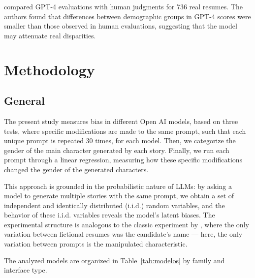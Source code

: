 \documentclass[12pt,a4paper]{article}
\begin{document}
\citet{vaishampayan2025} compared GPT-4 evaluations with
human judgments for 736 real resumes. The authors found
that differences between demographic groups in GPT-4 scores were
smaller than those observed in human evaluations, suggesting that the model
may attenuate real disparities.


\section{Methodology}





\subsection{General}


The present study measures bias in different Open AI models, based
on three tests, where specific modifications are made to the same
prompt, such that each unique prompt is repeated 30 times, for each model.
Then, we categorize the gender of the main character generated by each
story. Finally, we run each prompt through a linear regression,
measuring how these specific modifications changed the gender of the
generated characters.

This approach is grounded in the probabilistic nature of LLMs: by
asking a model to generate multiple stories with the same prompt,
we obtain a set of independent and identically distributed (i.i.d.) random variables,
and the behavior of these i.i.d. variables reveals the model's latent biases.
The experimental structure is analogous to the classic experiment by
\citet{bertrand2004}, where the only variation between fictional
resumes was the candidate's name --- here, the only variation between
prompts is the manipulated characteristic.

The analyzed models are organized in Table~\ref{tab:modelos} by family and interface type.
\end{document}
